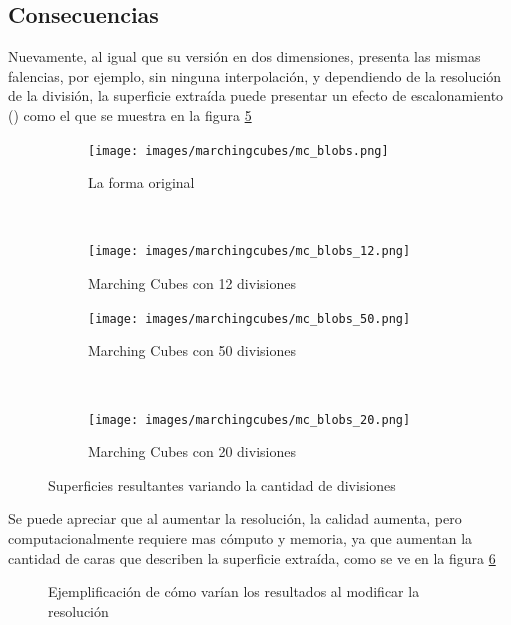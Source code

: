 \subsection{Consecuencias}
\label{subsec:marchingCubes:consecuencias}

Nuevamente, al igual que su versión en dos dimensiones, presenta las mismas falencias, 
por ejemplo, sin ninguna interpolación, y dependiendo de la resolución de la división, la 
superficie extraída puede presentar un efecto de escalonamiento () como el que se 
muestra en la figura \ref{f:estadoDelArte;superficies_resultantes_variando_divisiones}

\begin{figure}

	\begin{subfigure}{0.45\textwidth}
		\centering
		\texttt{[image: images/marchingcubes/mc\_blobs.png]}
		\caption{La forma original}
		\label{f:estadoDelArte:mc_blobs}
	\end{subfigure}
	~
	\begin{subfigure}{0.45\textwidth}
		\centering
		\texttt{[image: images/marchingcubes/mc\_blobs\_12.png]}
		\caption{Marching Cubes con 12 divisiones}
		\label{f:estadoDelArte:mc_blobs_12}
	\end{subfigure}

	\begin{subfigure}{0.45\textwidth}
		\centering
		\texttt{[image: images/marchingcubes/mc\_blobs\_50.png]}
		\caption{Marching Cubes con 50 divisiones}
		\label{f:estadoDelArte:mc_blobs_50}
	\end{subfigure}
	~
	\begin{subfigure}{0.45\textwidth}
		\centering
		\texttt{[image: images/marchingcubes/mc\_blobs\_20.png]}
		\caption{Marching Cubes con 20 divisiones}
		\label{f:estadoDelArte:mc_blobs_20}
	\end{subfigure}

	\caption{Superficies resultantes variando la cantidad de divisiones}
	\label{f:estadoDelArte;superficies_resultantes_variando_divisiones}
\end{figure}

Se puede apreciar que al aumentar la resolución, la calidad aumenta, pero 
computacionalmente requiere mas cómputo y memoria, ya que aumentan la cantidad de caras que 
describen la superficie extraída, como se ve en la figura \ref{f:estadoDelArte:polygonise3}

\begin{figure}[hbp]
\centering
\caption{Ejemplificación de cómo varían los resultados al modificar la resolución}
\label{f:estadoDelArte:polygonise3}
\end{figure}

